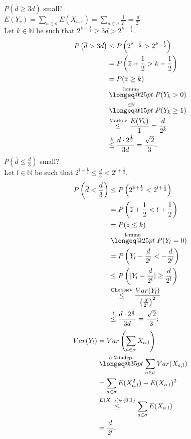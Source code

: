 \documentclass[a4paper, 12pt]{book}
\makeatletter
\theoremstyle{definition}
\theoremstyle{remark}
\newcommand{\N}{\mathbb{N}}
\newcommand{\longeq}[1]{\mathrel{\mathpalette\longeq@{#1}}}
\newcommand{\longeq@}[2]{%
  \begingroup
  \sbox\z@{$\m@th#1=$}%
  \ifdim#2<\wd\z@
    \resizebox{#2}{\height}{\box\z@}%
  \else
    \ifdim#2<3\wd\z@
      \hbox to #2{$\m@th#1=\hss=\hss=\hss=$}%
    \else
      \hbox to #2{$\m@th#1=\cleaders\hbox to 0.2\wd\z@{\hss$#1=$\hss}\hfil=$}%
    \fi
  \fi
  \endgroup
}
\makeatother
\begin{document}
$P(\overline{d} \geq 3d)$ small? \\
$E(Y_r) = \sum_{a \in \sigma} E(X_{a, r}) = \sum_{a \in \sigma} \frac{1}{2^r} = \frac{d}{2^r}$ \\
Let $k \in \N$ be such that $2^{k + \frac{1}{2}} \geq 3d > 2^{k - \frac{1}{2}}$.
\begin{align*}
  P\left(\overline{d} > 3d\right) &\leq P\left(2^{\overline{z} - \frac{1}{2}} > 2^{k - \frac{1}{2}}\right) \\
  &= P\left(\overline{z} + \frac{1}{2} > k - \frac{1}{2}\right) \\
  &= P(\overline{z} \geq k) \\
  &\stackrel{\text{lemma}}{\longeq{25pt}} P(Y_k > 0) \\
  &\stackrel{\in \N}{\longeq{15pt}} P(Y_k \geq 1) \\
  &\stackrel{\text{Markov}}{\leq} \frac{E(Y_k)}{1} = \frac{d}{2^k} \\
  &\stackrel{k}{\leq} \frac{d \cdot 2^{\frac{1}{3}}}{3d} = \frac{\sqrt{2}}{3}.
\end{align*}
$P(\overline{d} \leq \frac{d}{3})$ small? \\
Let $l \in \N$ be such that $2^{l - \frac{1}{2}} \leq \frac{d}{3} < 2^{l + \frac{1}{2}}$.
\begin{align*}
  P\left(\overline{d} < \frac{d}{3}\right) &\leq P\left(2^{\overline{z} + \frac{1}{2}} < 2^{l + \frac{1}{2}}\right) \\
  &= P\left(\overline{z} + \frac{1}{2} < l + \frac{1}{2}\right) \\
  &= P(\overline{z} \leq k) \\
  &\stackrel{\text{lemma}}{\longeq{25pt}} P(Y_l = 0) \\
  &= P\left(Y_l - \frac{d}{2^l} < -\frac{d}{2^l}\right) \\
  &\leq P\left(|Y_l - \frac{d}{2^l}| \geq \frac{d}{2^l}\right) \\
  &\stackrel{\text{Chebisev}}{\leq} \frac{Var(Y_l)}{\left(\frac{d}{2^l}\right)^2} \\
  &\stackrel{l}{\leq} \frac{d \cdot 2^{\frac{1}{3}}}{3d} = \frac{\sqrt{2}}{3};
\end{align*}
\begin{align*}
  Var(Y_l) &= Var\left(\sum_{a \in \sigma} X_{a, l}\right) \\
  &\stackrel{h \text{ 2-indep.}}{\longeq{35pt}} \sum_{a \in \sigma} Var(X_{a, l}) \\
  &= \sum_{a \in \sigma} E(X_{a, l}^2) - E(X_{a, l})^2 \\
  &\stackrel{E(X_{a,l}) \in \{0,1\}}{\leq} \sum_{a \in \sigma} E(X_{a, l}) \\
  &= \frac{d}{2^l}.
\end{align*}
\end{document}
